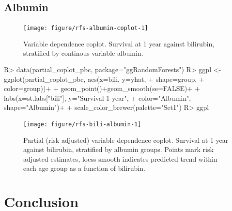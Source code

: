 \documentclass[nojss]{jss}\usepackage[]{graphicx}\usepackage[]{color}
\begin{document}
\subsection{Albumin}
\begin{Schunk}
\begin{figure}[!htpb]

{\centering \texttt{[image: figure/rfs-albumin-coplot-1]} 

}

\caption[Variable dependence coplot]{Variable dependence coplot. Survival at 1 year against bilirubin, stratified by continous variable albumin.\label{fig:albumin-coplot}}
\end{figure}
\end{Schunk}



\begin{Schunk}
\begin{Sinput}
R> data(partial_coplot_pbc, package="ggRandomForests")
R> ggpl <- ggplot(partial_coplot_pbc, aes(x=bili, y=yhat, 
+                                           shape=group, 
+                                           color=group))+
+   geom_point()+geom_smooth(se=FALSE)+
+   labs(x=st.labs["bili"], y="Survival 1 year", 
+        color="Albumin", shape="Albumin")+
+   scale_color_brewer(palette="Set1")
R> ggpl
\end{Sinput}
\begin{figure}[!htpb]

{\centering \texttt{[image: figure/rfs-bili-albumin-1]} 

}

\caption[Partial (risk adjusted) variable dependence coplot]{Partial (risk adjusted) variable dependence coplot. Survival at 1 year against bilirubin, stratified by albumin groups. Points mark risk adjusted estimates, loess smooth indicates predicted trend within each age group as a function of bilirubin.\label{fig:bili-albumin}}
\end{figure}
\end{Schunk}

\section{Conclusion}

\appendix


\end{document}
